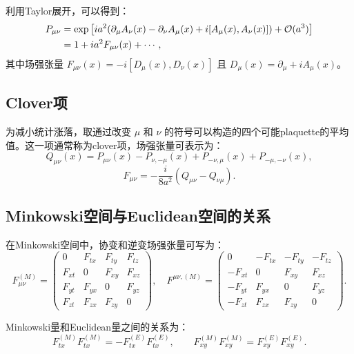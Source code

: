\documentclass[11pt,a4paper]{article}
\begin{document}
利用Taylor展开，可以得到：
\begin{align}
    P_{\mu\nu} &= \exp\qty[i a^2 \qty(\partial_\mu A_\nu(x) - \partial_\nu A_\mu(x) + i [A_\mu(x), A_\nu(x)]) + \mathcal{O}(a^3)] \nonumber\\
    &= 1 + i a^2 F_{\mu\nu}(x) + \cdots,
\end{align}
其中场强张量 $F_{\mu\nu}(x) = -i [D_\mu(x), D_\nu(x)]$ 且 $D_\mu(x) = \partial_\mu + i A_\mu(x)$。

\subsection{Clover项}

为减小统计涨落，取通过改变 $\mu$ 和 $\nu$ 的符号可以构造的四个可能plaquette的平均值。这一项通常称为clover项，场强张量可表示为：
\begin{equation}\label{eq:Qmunu}
    Q_{\mu\nu}(x) = P_{\mu\nu}(x) - P_{\nu,-\mu}(x) + P_{-\nu,\mu}(x) + P_{-\mu,-\nu}(x),
\end{equation}
\begin{equation}\label{eq:F_clover}
    F_{\mu\nu} = -\frac{i}{8a^2} (Q_{\mu\nu} - Q_{\nu\mu}).
\end{equation}

\subsection{Minkowski空间与Euclidean空间的关系}

在Minkowski空间中，协变和逆变场强张量可写为：
\begin{equation}
    F^{(M)}_{\mu\nu} = \begin{pmatrix}
        0 & F_{tx} & F_{ty} & F_{tz} \\
        F_{xt} & 0 & F_{xy} & F_{xz} \\
        F_{yt} & F_{yx} & 0 & F_{yz} \\
        F_{zt} & F_{zx} & F_{zy} & 0
    \end{pmatrix}, \quad
    F^{\mu\nu,(M)} = \begin{pmatrix}
        0 & -F_{tx} & -F_{ty} & -F_{tz} \\
        -F_{xt} & 0 & F_{xy} & F_{xz} \\
        -F_{yt} & F_{yx} & 0 & F_{yz} \\
        -F_{zt} & F_{zx} & F_{zy} & 0
    \end{pmatrix}.
\end{equation}

Minkowski量和Euclidean量之间的关系为：
\begin{equation}\label{eq:ME_relation}
    F^{(M)}_{tx} F^{(M)}_{tx} = -F^{(E)}_{tx} F^{(E)}_{tx}, \qquad
    F^{(M)}_{xy} F^{(M)}_{xy} = F^{(E)}_{xy} F^{(E)}_{xy}.
\end{equation}
\end{document}
